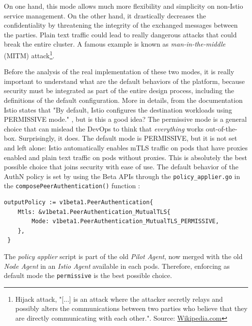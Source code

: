 On one hand, this mode allows much more flexibility and simplicity on non-Istio service management. On the other hand, it drastically decreases the confidentiality by threatening the integrity of the exchanged messages between the parties. Plain text traffic could lead to really dangerous attacks that could break the entire cluster. A famous example is known as \textit{man-in-the-middle} (MITM) attack\footnote{Hijack attack, "[...] is an attack where the attacker secretly relays and possibly alters the communications between two parties who believe that they are directly communicating with each other.". Source: \href{https://en.wikipedia.org/wiki/Man-in-the-middle_attack}{Wikipedia.com}}.

Before the analysis of the real implementation of these two modes, it is really important to understand what are the default behaviors of the platform, because security must be integrated as part of the entire design process, including the definitions of the default configuration. More in details, from the documentation Istio states that "By default, Istio configures the destination workloads using PERMISSIVE mode." \cite{istiosec}, but is this a good idea? The permissive mode is a general choice that can mislead the DevOps to think that \textit{everything} works out-of-the-box. Surprisingly, it does. The default mode is PERMISSIVE, but it is not set and left alone: Istio automatically enables mTLS traffic on pods that have proxies enabled and plain text traffic on pods without proxies. This is absolutely the best possible choice that joins security with ease of use. The default behavior of the AuthN policy is set by using the Beta APIs through the \texttt{policy\_applier.go} in the \texttt{composePeerAuthentication()} function \cite{istiocode}:
\vspace{0.3cm}
\begin{lstlisting}[title={\href{https://github.com/istio/istio/blob/ec8b8ba452b372b8ceaf8a5dea973bc561bf39b4/pilot/pkg/security/authn/v1beta1/policy\_applier.go\#L411}{GitHub permalink}}]
 outputPolicy := v1beta1.PeerAuthentication{
    Mtls: &v1beta1.PeerAuthentication_MutualTLS{
        Mode: v1beta1.PeerAuthentication_MutualTLS_PERMISSIVE,
    },
 }

\end{lstlisting}


The \textit{policy applier} script is part of the old \textit{Pilot Agent}, now merged with the old \textit{Node Agent} in an \textit{Istio Agent} available in each pods. Therefore, enforcing as default mode the \texttt{permissive} is the best possible choice.

